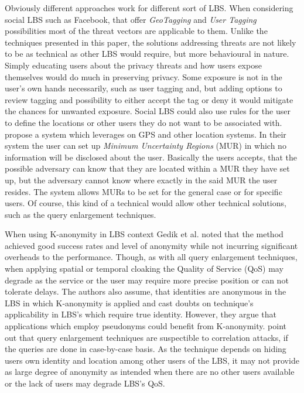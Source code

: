 \documentclass[english]{tktltiki2}
\theoremstyle{definition}
\theoremstyle{remark}
\begin{document}
Obviously different approaches work for different sort of LBS. When considering social LBS such as Facebook, that offer \textit{GeoTagging} and \textit{User Tagging} possibilities most of the threat vectors are applicable to them. Unlike the techniques presented in this paper, the solutions addressing threats are not likely to be as technical as other LBS would require, but more behavioural in nature. Simply educating users about the privacy threats and how users expose themselves would do much in preserving privacy. Some exposure is not in the user's own hands necessarily, such as user tagging and, but adding options to review tagging and possibility to either accept the tag or deny it would mitigate the chances for unwanted exposure. Social LBS could also use rules for the user to define the locations  or other users they do not want to be associated with. \cite{mascetti} propose a system which leverages on GPS and other location systems. In their system the user can set up \textit{Minimum Uncertainty Regions} (MUR) in which no information will be disclosed about the user. Basically the users accepts, that the possible adversary can know that they are located within a MUR they have set up, but the adversary cannot know where exactly in the said MUR the user resides. The system allows MURs to be set for the general case or for specific users. Of course, this kind of a technical would allow other technical solutions, such as the query enlargement techniques. \par
When using K-anonymity in LBS context Gedik et al.\cite{Gedik2008} noted that the method achieved good success rates and level of anonymity while not incurring significant overheads to the performance. Though, as with all query enlargement techniques, when applying spatial or temporal cloaking the Quality of Service (QoS) may degrade as the service or the user may require more precise position or can not tolerate delays. The authors also assume, that identities are anonymous in the LBS in which K-anonymity is applied and cast doubts on technique's applicability in LBS's which require true identity. However, they argue that applications which employ pseudonyms could benefit from K-anonymity. \cite{Ghinita2008} point out that query enlargement techniques are suspectible  to correlation attacks, if the queries are done in case-by-case basis. As the technique depends on hiding users own identity and location among other users of the LBS, it may not provide as large degree of anonymity as intended when there are no other users available or the lack of users may degrade LBS's QoS. \par
\end{document}
